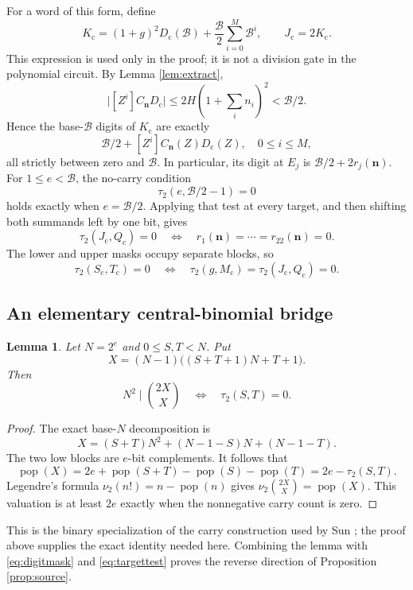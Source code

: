 \documentclass[11pt]{article}
\newcommand{\pc}{\operatorname{pop}}
\newcommand{\BB}{\mathcal B}
\newcommand{\Dcode}{D_{\mathrm c}}
\newtheorem{lemma}[theorem]{Lemma}
\theoremstyle{definition}
\theoremstyle{remark}
\numberwithin{equation}{section}
\begin{document}
For a word of this form, define
\[
 K_{\mathrm c}=(1+g)^2\Dcode(\BB)
                  +\frac{\BB}{2}\sum_{i=0}^{M}\BB^i,
 \qquad J_{\mathrm c}=2K_{\mathrm c}.
\]
This expression is used only in the proof; it is not a division gate in
the polynomial circuit. By Lemma \ref{lem:extract},
\[
 \bigl|[Z^i]C_{\mathbf n}\Dcode\bigr|
 \le2H(1+\textstyle\sum_i n_i)^2<\BB/2.
\]
Hence the base-\(\BB\) digits of \(K_{\mathrm c}\) are exactly
\[
 \BB/2+[Z^i]C_{\mathbf n}(Z)\Dcode(Z),
 \quad 0\le i\le M,
\]
all strictly between zero and \(\BB\).
In particular, its digit at \(E_j\) is \(\BB/2+2r_j(\mathbf n)\).
For \(1\le e<\BB\), the no-carry condition
\[
 \tau_2(e,\BB/2-1)=0
\]
holds exactly when \(e=\BB/2\). Applying that test at every target, and
then shifting both summands left by one bit, gives
\begin{equation}\label{eq:targettest}
 \tau_2(J_{\mathrm c},Q_{\mathrm c})=0
 \quad\Longleftrightarrow\quad
 r_1(\mathbf n)=\cdots=r_{22}(\mathbf n)=0.
\end{equation}
The lower and upper masks occupy separate blocks, so
\[
 \tau_2(S_{\mathrm c},T_{\mathrm c})=0
 \quad\Longleftrightarrow\quad
 \tau_2(g,M_{\mathrm c})=\tau_2(J_{\mathrm c},Q_{\mathrm c})=0.
\]

\subsection{An elementary central-binomial bridge}

\begin{lemma}\label{lem:binomial}
Let \(N=2^e\) and \(0\le S,T<N\). Put
\[
 X=(N-1)\bigl((S+T+1)N+T+1\bigr).
\]
Then
\[
 N^2\mid\binom{2X}{X}
 \quad\Longleftrightarrow\quad \tau_2(S,T)=0.
\]
\end{lemma}

\begin{proof}
The exact base-\(N\) decomposition is
\[
 X=(S+T)N^2+(N-1-S)N+(N-1-T).
\]
The two low blocks are \(e\)-bit complements. It follows that
\[
 \pc(X)=2e+\pc(S+T)-\pc(S)-\pc(T)
       =2e-\tau_2(S,T).
\]
Legendre's formula \(\nu_2(n!)=n-\pc(n)\) gives
\(\nu_2\binom{2X}{X}=\pc(X)\).
This valuation is at least \(2e\) exactly when the nonnegative carry
count is zero.
\end{proof}

This is the binary specialization of the carry construction used by Sun
\cite{sun2021}; the proof above supplies the exact identity needed here.
Combining the lemma with \eqref{eq:digitmask} and
\eqref{eq:targettest} proves the reverse direction of
Proposition \ref{prop:source}.
\end{document}
